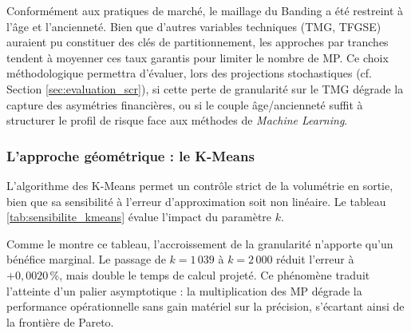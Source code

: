 Conformément aux pratiques de marché, le maillage du Banding a été restreint à l'âge et l'ancienneté. Bien que d'autres variables techniques (TMG, TFGSE) auraient pu constituer des clés de partitionnement, les approches par tranches tendent à moyenner ces taux garantis pour limiter le nombre de MP. Ce choix méthodologique permettra d'évaluer, lors des projections stochastiques (cf. Section \ref{sec:evaluation_scr}), si cette perte de granularité sur le TMG dégrade la capture des asymétries financières, ou si le couple âge/ancienneté suffit à structurer le profil de risque face aux méthodes de \textit{Machine Learning}.

\subsubsection{L'approche géométrique : le K-Means}

L'algorithme des K-Means permet un contrôle strict de la volumétrie en sortie, bien que sa sensibilité à l'erreur d'approximation soit non linéaire. Le tableau \ref{tab:sensibilite_kmeans} évalue l'impact du paramètre $k$.

\begin{table}[H]
    \centering
    \renewcommand{\arraystretch}{1.4}
    \footnotesize
    \caption{Sensibilité du K-Means au nombre cible de clusters ($k$).}
    \label{tab:sensibilite_kmeans}
\end{table}

Comme le montre ce tableau, l'accroissement de la granularité n'apporte qu'un bénéfice marginal. Le passage de $k = 1\,039$ à $k = 2\,000$ réduit l'erreur à $+0{,}0020\,\%$, mais double le temps de calcul projeté. Ce phénomène traduit l'atteinte d'un palier asymptotique : la multiplication des MP dégrade la performance opérationnelle sans gain matériel sur la précision, s'écartant ainsi de la frontière de Pareto.

